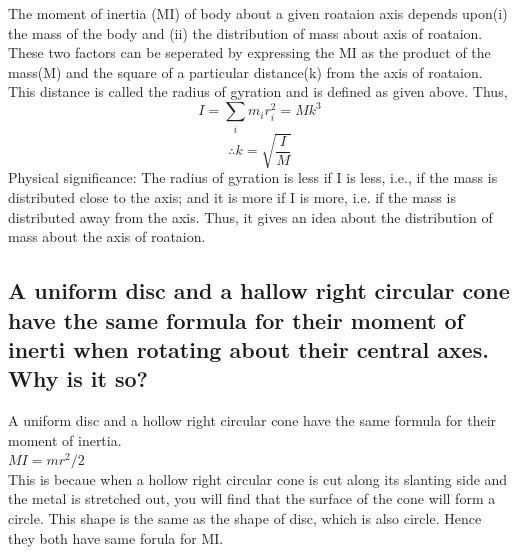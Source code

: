 \documentclass{article}
\begin{document}
   The moment of inertia (MI) of body about a given roataion 
   axis depends upon(i) the mass of the body and (ii) the 
   distribution of mass about axis of roataion. These two factors
   can be seperated by expressing the MI as the product of the
   mass(M) and the square of a particular distance(k) from the 
   axis of roataion. This distance is called the radius of
   gyration and is defined as given above. Thus,
   \begin{equation}
   	I = \sum_{i} m_ir_i^2 = Mk^3 
   \end{equation}
   \begin{equation}
	   \therefore k = \sqrt{\frac{I}{M}}
   \end{equation}
   Physical significance: The radius of gyration is less if I is
   less, i.e., if the mass is distributed close to the axis;
   and it is more if I is more, i.e. if the mass is distributed
   away from the axis. Thus, it gives an idea about the 
   distribution of mass about the axis of roataion.

   \subsection{A uniform disc and a hallow right circular cone
   have the same formula for their moment of inerti when 
   rotating about their central axes. Why is it so?}
   A uniform disc and a hollow right circular cone have the 
   same formula for their moment of inertia.\\
   $MI = mr^2/2$ \\
   This is becaue when a hollow right circular cone is cut 
   along its slanting side and the metal is stretched out, you
   will find that the surface of the cone will form a circle.
   This shape is the same as the shape of disc, which is also
   circle. Hence they both have same forula for MI.
\end{document}
